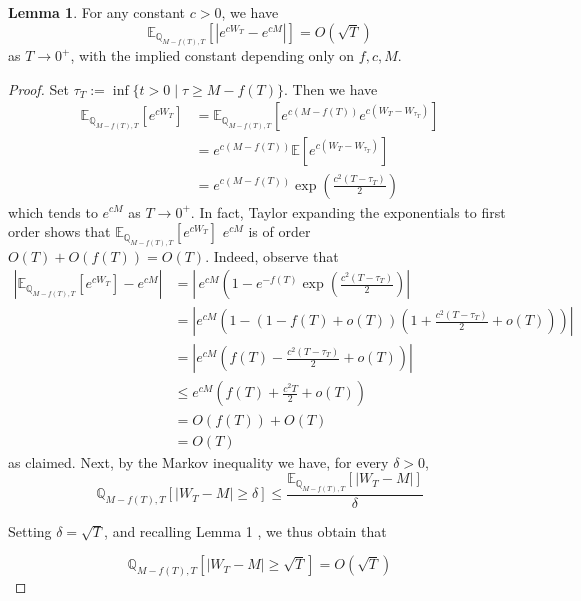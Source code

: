 \documentclass{article}
\theoremstyle{definition}
\newtheorem{lemma}[theorem]{Lemma}
\theoremstyle{definition}
\begin{document}
\begin{lemma}For any constant $c>0$, we have
$$
\mathbb{E}_{\mathbb{Q}_{M-f(T), T}}\left[\left|e^{c W_{T}}-e^{c M}\right|\right]=O(\sqrt{T})
$$
as $T \rightarrow 0^{+}$, with the implied constant depending only on $f, c, M$.
\end{lemma}
\begin{proof} Set $\tau_{T}:=\inf \{t>0 \mid \tau \geq M-f(T)\}$. Then we have
$$
\begin{aligned}
\mathbb{E}_{\mathbb{Q}_{M-f(T), T}}\left[e^{c W_{T}}\right] & =\mathbb{E}_{\mathbb{Q}_{M-f(T), T}}\left[e^{c(M-f(T))} e^{c\left(W_{T}-W_{\tau_{T}}\right)}\right] \\
& =e^{c(M-f(T))} \mathbb{E}\left[e^{c\left(W_{T}-W_{\tau_{T}}\right)}\right] \\
& =e^{c(M-f(T))} \exp \left(\frac{c^{2}\left(T-\tau_{T}\right)}{2}\right)
\end{aligned}
$$
which tends to $e^{c M}$ as $T \rightarrow 0^{+}$. In fact, Taylor expanding the exponentials to first order shows that $\mathbb{E}_{\mathbb{Q}_{M-f(T), T}}\left[e^{c W_{T}}\right]$ $e^{c M}$ is of order $O(T)+O(f(T))=O(T)$. Indeed, observe that
$$
\begin{aligned}
\left|\mathbb{E}_{\mathbb{Q}_{M-f(T), T}}\left[e^{c W_{T}}\right]-e^{c M}\right| & =\left\lvert\, e^{c M}\left(\left.1-e^{-f(T)} \exp \left(\frac{c^{2}\left(T-\tau_{T}\right)}{2}\right) \right\rvert\,\right.\right. \\
& =\left|e^{c M}\left(1-(1-f(T)+o(T))\left(1+\frac{c^{2}\left(T-\tau_{T}\right)}{2}+o(T)\right)\right)\right| \\
& =\left|e^{c M}\left(f(T)-\frac{c^{2}\left(T-\tau_{T}\right)}{2}+o(T)\right)\right| \\
& \leq e^{c M}\left(f(T)+\frac{c^{2} T}{2}+o(T)\right) \\
& =O(f(T))+O(T) \\
& =O(T)
\end{aligned}
$$
as claimed. Next, by the Markov inequality we have, for every $\delta>0$,
$$
\mathbb{Q}_{M-f(T), T}\left[\left|W_{T}-M\right| \geq \delta\right] \leq \frac{\mathbb{E}_{\mathbb{Q}_{M-f(T), T}}\left[\left|W_{T}-M\right|\right]}{\delta}
$$

Setting $\delta=\sqrt{T}$, and recalling Lemma 1 , we thus obtain that

\begin{equation}
\mathbb{Q}_{M-f(T), T}\left[\left|W_{T}-M\right| \geq \sqrt{T}\right]=O(\sqrt{T}) 
\end{equation}



\end{proof}
\end{document}

